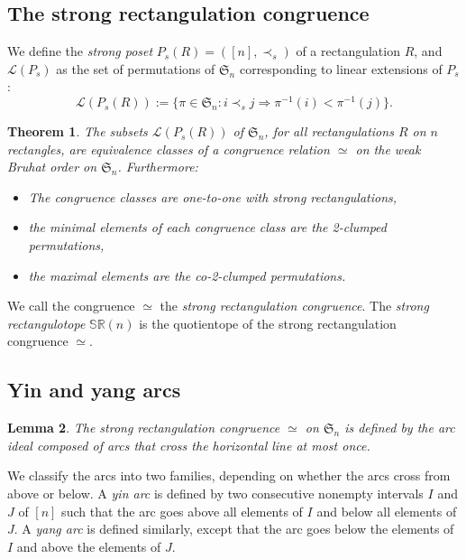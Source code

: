 \documentclass{amsart}
\newtheorem{theorem}{Theorem}%
\newtheorem{lemma}[theorem]{Lemma}
\theoremstyle{definition}
\newcommand{\f}[1]{\mathfrak{#1}} %
\renewcommand{\implies}{\Rightarrow} %
\newcommand{\darkblue}{\color{darkblue}} %
\newcommand{\defn}[1]{\textsl{\darkblue #1}} %
\newcommand{\polytope}[1]{\mathds{#1}} %
\newcommand{\SRP}{\polytope{SR}} %
\newcommand{\strongeq}{\simeq}%
\begin{document}
\subsection{The strong rectangulation congruence}

We define the \defn{strong poset} $P_s(R)=([n],\prec_s)$ of a rectangulation $R$, and $\mathcal{L}(P_s)$ as the set of permutations of $\f{S}_n$ corresponding to linear extensions of $P_s$:
\[
\mathcal{L}(P_s(R)) := \{\pi\in\f{S}_n : i\prec_s j\implies \pi^{-1}(i) < \pi^{-1}(j)\}.
\]

\begin{theorem}
  The subsets $\mathcal{L}(P_s(R))$ of $\f{S}_n$, for all rectangulations $R$ on $n$ rectangles, 
  are equivalence classes of a congruence relation $\strongeq$ on the weak Bruhat order on $\f{S}_n$.
    Furthermore:
  \begin{itemize}
  \item The congruence classes are one-to-one with strong rectangulations,  
  \item the minimal elements of each congruence class are the 2-clumped permutations,
  \item the maximal elements are the co-2-clumped permutations.
  \end{itemize}
\end{theorem}

We call the congruence $\strongeq$ the \defn{strong rectangulation congruence}.
The \defn{strong rectangulotope} $\SRP(n)$ is the quotientope of the strong rectangulation congruence $\strongeq$.


\subsection{Yin and yang arcs}

\begin{lemma}
  The strong rectangulation congruence $\strongeq$ on $\f{S}_n$ is defined by the arc ideal composed of arcs that cross the horizontal line at most once.
\end{lemma}


We classify the arcs into two families, depending on whether the arcs cross from above or below.
A \defn{yin arc} is defined by two consecutive nonempty intervals $I$ and $J$ of $[n]$ such that the arc goes above all elements of $I$ and below all elements of $J$.
A \defn{yang arc} is defined similarly, except that the arc goes below the elements of $I$ and above the elements of $J$. 
\end{document}
